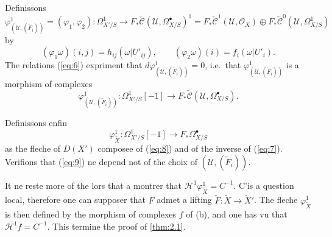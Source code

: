 \documentclass[12pt,a4paper]{article}
\theoremstyle{plain}
\theoremstyle{definition}
\theoremstyle{remark}
\newcommand{\cO}{\mathcal{O}}
\begin{document}
Definissons
\[
\varphi^1_{(\mathscr{U}, (\tilde{F}_i))} = (\varphi_1, \varphi_2): \Omega^1_{X'/S} \to F_* \check{\mathscr{C}}(\mathscr{U}, \Omega^{\bullet}_{X/S})^1 = F_* \check{\mathscr{C}}^1(\mathscr{U}, \cO_X) \oplus F_* \check{\mathscr{C}}^0(\mathscr{U}, \Omega^1_{X/S})
\]
by
\[
(\varphi_1 \omega)(i,j) = h_{ij}(\omega|U'_{ij}), \qquad (\varphi_2 \omega)(i) = f_i(\omega|U'_i).
\]
The relations (\ref{eq:6}) expriment that $d\varphi^1_{(\mathscr{U}, (\tilde{F}_i))} = 0$, i.e.~that $\varphi^1_{(\mathscr{U}, (\tilde{F}_i))}$ is a morphism of complexes
\begin{equation}\label{eq:8}
\varphi^1_{(\mathscr{U}, (\tilde{F}_i))}: \Omega^1_{X'/S}[-1] \to F_* \check{\mathscr{C}}(\mathscr{U}, \Omega^{\bullet}_{X/S}).
\end{equation}

Definissons enfin
\begin{equation}\label{eq:9}
\varphi^1_{\tilde{X}}: \Omega^1_{X'/S}[-1] \to F_* \Omega^{\bullet}_{X/S}
\end{equation}
as the fleche of $D(X')$ composee of (\ref{eq:8}) and of the inverse of (\ref{eq:7}). Verifions that (\ref{eq:9}) ne depend not of the choix of $(\mathscr{U}, (\tilde{F}_i))$.

It ne reste more of the lors that a montrer that $\mathscr{H}^1 \varphi^1_{\tilde{X}} = C^{-1}$. C'is a question local, therefore one can supposer that $F$ admet a lifting $\tilde{F}: \tilde{X} \to \tilde{X}'$. The fleche $\varphi^1_{\tilde{X}}$ is then defined by the morphism of complexes $f$ of (b), and one has vu that $\mathscr{H}^1 f = C^{-1}$. This termine the proof of \ref{thm:2.1}.
\end{document}
